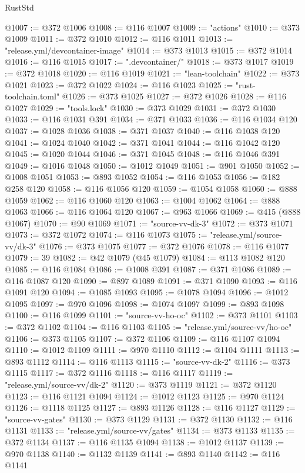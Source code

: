 \begin{lexlean}{RustStd}
\begin{coremodule}
@1007 := @372 @1006
@1008 := @116 @1007
@1009 := "actions"
@1010 := @373 @1009
@1011 := @372 @1010
@1012 := @116 @1011
@1013 := "release.yml/devcontainer-image"
@1014 := @373 @1013
@1015 := @372 @1014
@1016 := @116 @1015
@1017 := ".devcontainer/"
@1018 := @373 @1017
@1019 := @372 @1018
@1020 := @116 @1019
@1021 := "lean-toolchain"
@1022 := @373 @1021
@1023 := @372 @1022
@1024 := @116 @1023
@1025 := "rust-toolchain.toml"
@1026 := @373 @1025
@1027 := @372 @1026
@1028 := @116 @1027
@1029 := "tools.lock"
@1030 := @373 @1029
@1031 := @372 @1030
@1033 := @116 @1031 @391
@1034 := @371 @1033
@1036 := @116 @1034 @120
@1037 := @1028 @1036
@1038 := @371 @1037
@1040 := @116 @1038 @120
@1041 := @1024 @1040
@1042 := @371 @1041
@1044 := @116 @1042 @120
@1045 := @1020 @1044
@1046 := @371 @1045
@1048 := @116 @1046 @391
@1049 := @1016 @1048
@1050 := @1012 @1049
@1051 := @901 @1050
@1052 := @1008 @1051
@1053 := @893 @1052
@1054 := @116 @1053
@1056 := @182 @258 @120
@1058 := @116 @1056 @120
@1059 := @1054 @1058
@1060 := @888 @1059
@1062 := @116 @1060 @120
@1063 := @1004 @1062
@1064 := @888 @1063
@1066 := @116 @1064 @120
@1067 := @963 @1066
@1069 := @415 (@888 @1067)
@1070 := @90 @1069
@1071 := "source-vv-dk-3"
@1072 := @373 @1071
@1073 := @372 @1072
@1074 := @116 @1073
@1075 := "release.yml/source-vv/dk-3"
@1076 := @373 @1075
@1077 := @372 @1076
@1078 := @116 @1077
@1079 := 39
@1082 := @42 @1079 (@45 @1079)
@1084 := @113 @1082 @120
@1085 := @116 @1084
@1086 := @1008 @391
@1087 := @371 @1086
@1089 := @116 @1087 @120
@1090 := @897 @1089
@1091 := @371 @1090
@1093 := @116 @1091 @120
@1094 := @1085 @1093
@1095 := @1078 @1094
@1096 := @1012 @1095
@1097 := @970 @1096
@1098 := @1074 @1097
@1099 := @893 @1098
@1100 := @116 @1099
@1101 := "source-vv-ho-oc"
@1102 := @373 @1101
@1103 := @372 @1102
@1104 := @116 @1103
@1105 := "release.yml/source-vv/ho-oc"
@1106 := @373 @1105
@1107 := @372 @1106
@1109 := @116 @1107 @1094
@1110 := @1012 @1109
@1111 := @970 @1110
@1112 := @1104 @1111
@1113 := @893 @1112
@1114 := @116 @1113
@1115 := "source-vv-dk-2"
@1116 := @373 @1115
@1117 := @372 @1116
@1118 := @116 @1117
@1119 := "release.yml/source-vv/dk-2"
@1120 := @373 @1119
@1121 := @372 @1120
@1123 := @116 @1121 @1094
@1124 := @1012 @1123
@1125 := @970 @1124
@1126 := @1118 @1125
@1127 := @893 @1126
@1128 := @116 @1127
@1129 := "source-vv-gates"
@1130 := @373 @1129
@1131 := @372 @1130
@1132 := @116 @1131
@1133 := "release.yml/source-vv/gates"
@1134 := @373 @1133
@1135 := @372 @1134
@1137 := @116 @1135 @1094
@1138 := @1012 @1137
@1139 := @970 @1138
@1140 := @1132 @1139
@1141 := @893 @1140
@1142 := @116 @1141

\end{coremodule}
\end{lexlean}
